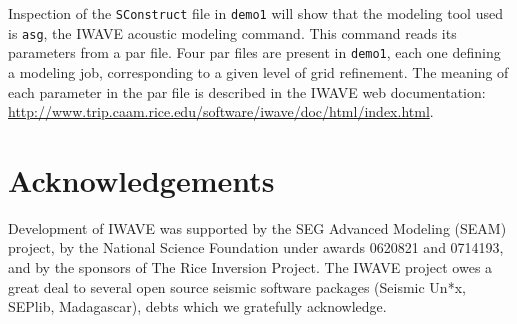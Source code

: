 Inspection of the {\tt SConstruct} file in {\tt demo1} will show that
the modeling tool used is {\tt asg}, the IWAVE
acoustic modeling command. This command reads its parameters from a
par file. Four par files are present in {\tt demo1}, each one defining
a modeling job, corresponding to a given level of grid refinement. The
meaning of each parameter in the par file is described in the IWAVE
web documentation:
\url{http://www.trip.caam.rice.edu/software/iwave/doc/html/index.html}.

\section{Acknowledgements}
Development of IWAVE was supported by the SEG Advanced Modeling (SEAM) project, by the National Science Foundation under awards 0620821 and 0714193, and by the sponsors of The Rice Inversion Project. The IWAVE project owes a great deal to several open source seismic software packages (Seismic Un*x, SEPlib, Madagascar), debts which we gratefully acknowledge.
 





